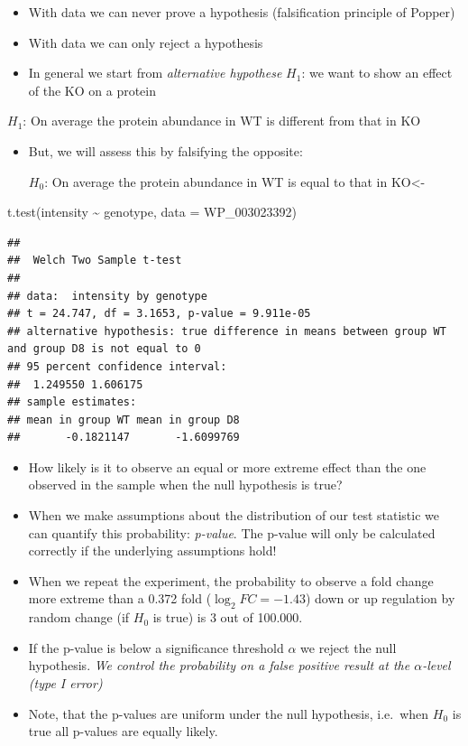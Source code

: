\documentclass[
]{article}
\newenvironment{Shaded}{\begin{snugshade}}{\end{snugshade}}
\newcommand{\AttributeTok}[1]{\textcolor[rgb]{0.77,0.63,0.00}{#1}}
\newcommand{\FunctionTok}[1]{\textcolor[rgb]{0.00,0.00,0.00}{#1}}
\newcommand{\NormalTok}[1]{#1}
\newcommand{\SpecialCharTok}[1]{\textcolor[rgb]{0.00,0.00,0.00}{#1}}
\providecommand{\tightlist}{%
  \setlength{\itemsep}{0pt}\setlength{\parskip}{0pt}}
\begin{document}
\begin{itemize}
\item
  With data we can never prove a hypothesis (falsification principle of
  Popper)
\item
  With data we can only reject a hypothesis
\item
  In general we start from \emph{alternative hypothese} \(H_1\): we want
  to show an effect of the KO on a protein
\end{itemize}

\(H_1\): On average the protein abundance in WT is different from that
in KO

\begin{itemize}
\tightlist
\item
  But, we will assess this by falsifying the opposite:

  \(H_0\): On average the protein abundance in WT is equal to that in
  KO\textless-
\end{itemize}

\begin{Shaded}
\begin{Highlighting}[]
\FunctionTok{t.test}\NormalTok{(intensity }\SpecialCharTok{\textasciitilde{}}\NormalTok{ genotype, }\AttributeTok{data =}\NormalTok{ WP\_003023392)}
\end{Highlighting}
\end{Shaded}

\begin{verbatim}
## 
##  Welch Two Sample t-test
## 
## data:  intensity by genotype
## t = 24.747, df = 3.1653, p-value = 9.911e-05
## alternative hypothesis: true difference in means between group WT and group D8 is not equal to 0
## 95 percent confidence interval:
##  1.249550 1.606175
## sample estimates:
## mean in group WT mean in group D8 
##       -0.1821147       -1.6099769
\end{verbatim}

\begin{itemize}
\item
  How likely is it to observe an equal or more extreme effect than the
  one observed in the sample when the null hypothesis is true?
\item
  When we make assumptions about the distribution of our test statistic
  we can quantify this probability: \emph{p-value}. The p-value will
  only be calculated correctly if the underlying assumptions hold!
\item
  When we repeat the experiment, the probability to observe a fold
  change more extreme than a 0.372 fold (\(\log_2 FC=-1.43\)) down or up
  regulation by random change (if \(H_0\) is true) is 3 out of
  100.000.\\
\item
  If the p-value is below a significance threshold \(\alpha\) we reject
  the null hypothesis. \emph{We control the probability on a false
  positive result at the \(\alpha\)-level (type I error)}
\item
  Note, that the p-values are uniform under the null hypothesis,
  i.e.~when \(H_0\) is true all p-values are equally likely.
\end{itemize}
\end{document}
